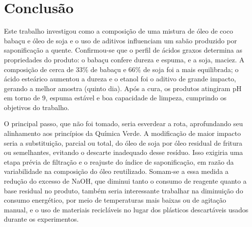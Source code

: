 \section{Conclusão}

Este trabalho investigou como a composição de uma mistura de óleo de coco babaçu e óleo de soja e o uso de aditivos influenciam um sabão produzido por saponificação a quente. Confirmou-se que o perfil de ácidos graxos determina as propriedades do produto: o babaçu confere dureza e espuma, e a soja, maciez. A composição de cerca de 33\% de babaçu e 66\% de soja foi a mais equilibrada; o ácido esteárico aumentou a dureza e o etanol foi o aditivo de grande impacto, gerando a melhor amostra (quinto dia). Após a cura, os produtos atingiram pH em torno de 9, espuma estável e boa capacidade de limpeza, cumprindo os objetivos do trabalho.

O principal passo, que não foi tomado, seria esverdear a rota, aprofundando seu alinhamento aos princípios da Química Verde. A modificação de maior impacto seria a substituição, parcial ou total, do óleo de soja por óleo residual de fritura ou semelhantes, evitando o descarte inadequado desse resíduo. Isso exigiria uma etapa prévia de filtração e o reajuste do índice de saponificação, em razão da variabilidade na composição do óleo reutilizado. Somam-se a essa medida a redução do excesso de NaOH, que diminui tanto o consumo de reagente quanto a base residual no produto, também seria interessante trabalhar na diminuição do consumo energético, por meio de temperaturas mais baixas ou de agitação manual, e o uso de materiais recicláveis no lugar dos plásticos descartáveis usados durante os experimentos.
